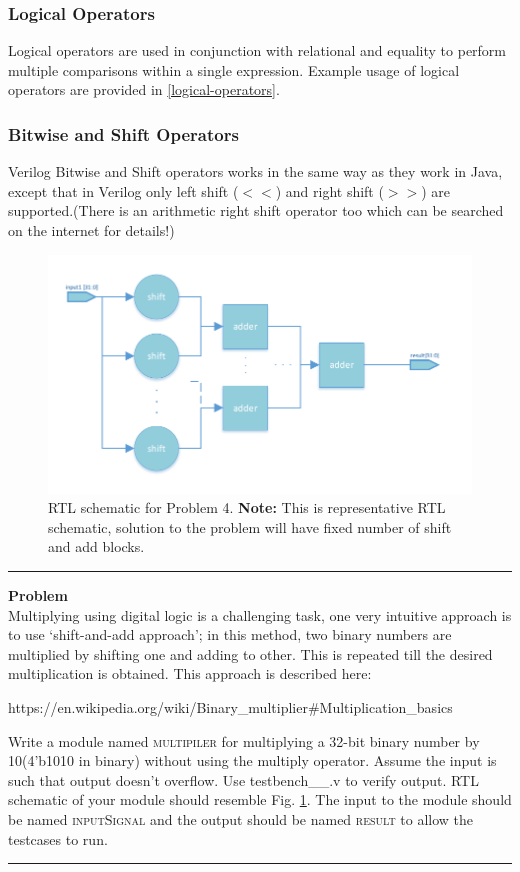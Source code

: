 \documentclass[a4paper,10pt]{article}
\newcommand{\ano}{\text{1}}
\theoremstyle{mytheor}
\newcommand{
  \insertverilog}[3]{
  
}
\newcounter{problemNumber}
\newcommand {
  \insertProblem}[1]{
  \vspace{0.5cm}
  \hrule
  \vspace{0.3cm}

  {\color{greatblue}\textbf{\large{Problem \theproblemNumber}}}
  \vspace{2pt}\\#1

  \addtocounter{problemNumber}{1}
  \vspace{0.2cm}
  \hrule  
  \vspace{0.5cm}
}
\begin{document}
\subsubsection*{Logical Operators}
Logical operators are used in conjunction with relational and equality
to perform multiple comparisons within a single expression.  Example
usage of logical operators are provided in \ref{logical-operators}.
\insertverilog{./verilog_files/logicalOperators.v}{logical-operators}{\text{Functioning
    of logical operator}}

\subsubsection*{Bitwise and Shift Operators}
Verilog Bitwise and Shift operators works in the same way as they work
in Java, except that in Verilog only left shift (\textbf{$<<$}) and
right shift (\textbf{$>>$}) are supported.(There is an arithmetic
right shift operator too which can be searched on the internet for
details!)

\begin{figure}[!h] \centering  
  \includegraphics[width=0.9\linewidth]{./resources/shift_and_add_representation.pdf}
  \caption{RTL schematic for Problem 4. \textbf{Note:} This is
    representative RTL schematic, solution to the problem will have
    fixed number of shift and add blocks.}
  \label{Fig:problem-4-RTL} 
\end{figure}    

\insertProblem { Multiplying using digital logic is a challenging
  task, one very intuitive approach is to use `shift-and-add
  approach'; in this method, two binary numbers are multiplied by
  shifting one and adding to other. This is repeated till the desired
  multiplication is obtained. This approach is described
  here: \begin{center}https://en.wikipedia.org/wiki/Binary\_multiplier\#Multiplication\_basics\end{center}
  
  Write a module named \textsc{multipiler} for multiplying a 32-bit
  binary number by 10(4'b1010 in binary) without using the multiply
  operator. Assume the input is such that output doesn't overflow. Use
  {testbench\_{\ano}\_{\theproblemNumber}.v} to verify output. RTL
  schematic of your module should resemble
  Fig. \ref{Fig:problem-4-RTL}. The input to the module should be
  named \textsc{inputSignal} and the output should be named
  \textsc{result} to allow the testcases to run.  }
\end{document}
